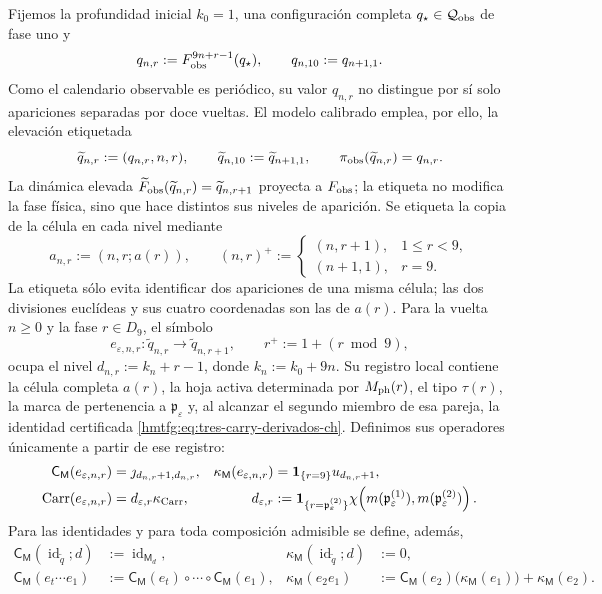Fijemos la profundidad inicial \(k_0=1\), una configuración completa
\(q_\star\in\mathcal Q_{\rm obs}\) de fase uno y
\[
 q_{n,r}:=F_{\rm obs}^{9n+r-1}(q_\star),\qquad
 q_{n,10}:=q_{n+1,1}.
\]
Como el calendario observable es periódico, su valor \(q_{n,r}\) no
distingue por sí solo apariciones separadas por doce vueltas. El modelo
calibrado emplea, por ello, la elevación etiquetada
\[
 \widetilde q_{n,r}:=(q_{n,r},n,r),\qquad
 \widetilde q_{n,10}:=\widetilde q_{n+1,1},\qquad
 \pi_{\rm obs}(\widetilde q_{n,r})=q_{n,r}.
\]
La dinámica elevada
\(\widetilde F_{\rm obs}(\widetilde q_{n,r})
=\widetilde q_{n,r+1}\) proyecta a \(F_{\rm obs}\); la etiqueta no modifica
la fase física, sino que hace distintos sus niveles de aparición.
Se etiqueta la copia de la célula en cada nivel mediante
\[
 a_{n,r}:=(n,r;a(r)),\qquad
 (n,r)^+:=
 \begin{cases}
  (n,r+1),&1\le r<9,\\
  (n+1,1),&r=9.
 \end{cases}
\]
La etiqueta sólo evita identificar dos apariciones de una misma célula; las
dos divisiones euclídeas y sus cuatro coordenadas son las de \(a(r)\).
Para la vuelta \(n\ge0\) y la fase \(r\in D_9\), el símbolo
\[
 e_{\varepsilon,n,r}:\widetilde q_{n,r}
 \longrightarrow\widetilde q_{n,r+1},
 \qquad r^+:=1+(r\bmod9),
\]
ocupa el nivel
\(d_{n,r}:=k_n+r-1\), donde \(k_n:=k_0+9n\). Su registro local contiene
la célula completa \(a(r)\), la hoja activa determinada por \(M_{\rm ph}(r)\),
el tipo \(\tau(r)\),
la marca de pertenencia a \(\mathfrak p_\varepsilon\) y, al alcanzar el segundo miembro
de esa pareja, la identidad certificada
\eqref{hmtfg:eq:tres-carry-derivados-ch}. Definimos sus operadores únicamente a
partir de ese registro:
\begin{align}
 \mathsf C_{\mathsf M}(e_{\varepsilon,n,r})
   &=\jmath_{d_{n,r}+1,d_{n,r}},&
 \kappa_{\mathsf M}(e_{\varepsilon,n,r})
   &=\mathbf1_{\{r=9\}}u_{d_{n,r}+1},
 \label{hmtfg:eq:memoria-arista-ch}\\
       \operatorname{Carr}(e_{\varepsilon,n,r})
   &=d_{\varepsilon,r}\kappa_{\rm Carr},&
 d_{\varepsilon,r}
   &:=\mathbf1_{\{r=\mathfrak p_\varepsilon^{(2)}\}}
       \chi\!\left(m(\mathfrak p_\varepsilon^{(1)}),
                    m(\mathfrak p_\varepsilon^{(2)})\right).
 \label{hmtfg:eq:carry-arista-derivado-ch}
\end{align}
Para las identidades y para toda composición admisible se define, además,
\begin{align}
 \mathsf C_{\mathsf M}(\operatorname{id}_{\widetilde q};d)
   &:=\operatorname{id}_{\mathsf M_d},&
 \kappa_{\mathsf M}(\operatorname{id}_{\widetilde q};d)&:=0,
 \label{hmtfg:eq:memoria-identidad-ch}\\
 \mathsf C_{\mathsf M}(e_t\cdots e_1)
   &:=\mathsf C_{\mathsf M}(e_t)\circ\cdots\circ
      \mathsf C_{\mathsf M}(e_1),&
 \kappa_{\mathsf M}(e_2e_1)
   &:=\mathsf C_{\mathsf M}(e_2)
        \bigl(\kappa_{\mathsf M}(e_1)\bigr)
      +\kappa_{\mathsf M}(e_2).
 \label{hmtfg:eq:cociclo-memoria-calibrado-ch}
\end{align}
